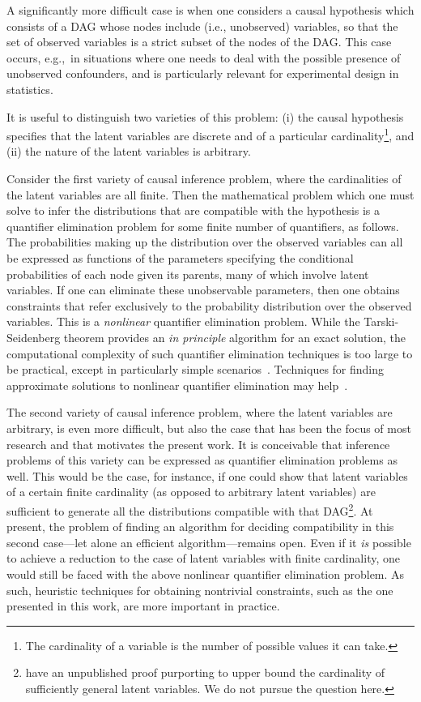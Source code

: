 A significantly more difficult case is when one considers a causal hypothesis which consists of a DAG whose nodes include  (i.e., unobserved) variables, so that the set of observed variables is a strict subset of the nodes of the DAG. This case occurs, e.g.,~in situations where one needs to deal with the possible presence of unobserved confounders, and is particularly relevant for experimental design in statistics. 

It is useful to distinguish two varieties of this problem: (i) the causal hypothesis specifies that the latent variables are discrete and of a particular cardinality\footnote{The cardinality of a variable is the number of possible values it can take.}, and (ii) the nature of the latent variables is arbitrary.  

Consider the first variety of causal inference problem, where the cardinalities of the latent variables are all finite. Then the mathematical problem which one must solve to infer the distributions that are compatible with the hypothesis is a quantifier elimination problem for some finite number of quantifiers, as follows. The probabilities making up the distribution over the observed variables can all be expressed as functions of the parameters specifying the conditional probabilities of each node given its parents, many of which involve latent variables. If one can eliminate these unobservable parameters, then one obtains constraints that refer exclusively to the probability distribution over the observed variables.  This is a {\em nonlinear} quantifier elimination problem. While the Tarski-Seidenberg theorem provides an \emph{in principle} algorithm for an exact solution, the computational complexity of such quantifier elimination techniques is too large to be practical, except in particularly simple scenarios~\cite{LeeSpekkens}. Techniques for finding approximate solutions to nonlinear quantifier elimination may help~\cite{ChavesPolynomial}.

The second variety of causal inference problem, where the latent variables are arbitrary, is even more difficult, but also the case that has been the focus of most research and that motivates the present work. It is conceivable that inference problems of this variety can be expressed as quantifier elimination problems as well. This would be the case, for instance, if one could show that latent variables of a certain finite cardinality (as opposed to arbitrary latent variables) are sufficient to generate all the distributions compatible with that DAG\footnote{\citet{rosset2016finite} have an unpublished proof purporting to upper bound the cardinality of sufficiently general latent variables. We do not pursue the question here.}. At present, the problem of finding an algorithm for deciding compatibility in this second case---let alone an efficient algorithm---remains open.  Even if it {\em is} possible to achieve a reduction to the case of latent variables with finite cardinality, one would still be faced with the above nonlinear quantifier elimination problem. As such, heuristic techniques for obtaining nontrivial constraints, such as the one presented in this work, are more important in practice. 

